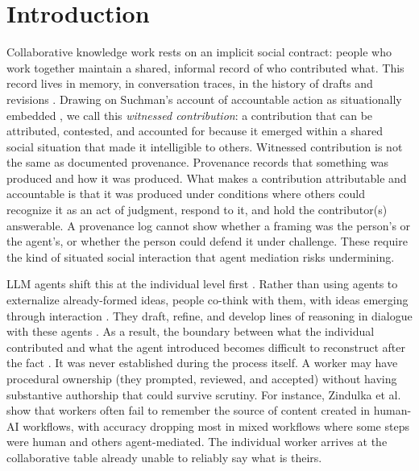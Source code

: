 \documentclass[manuscript,review]{acmart}
\begin{document}
\section{Introduction}
Collaborative knowledge work rests on an implicit social contract: people who work together maintain a shared, informal record of who contributed what. This record lives in memory, in conversation traces, in the history of drafts and revisions \cite{birnholtz2012tracking}. Drawing on Suchman's account of accountable action as situationally embedded \cite{suchman1987plans}, we call this \textit{witnessed contribution}: a contribution that can be attributed, contested, and accounted for because it emerged within a shared social situation that made it intelligible to others. Witnessed contribution is not the same as documented provenance. Provenance records that something was produced and how it was produced. What makes a contribution attributable and accountable is that it was produced under conditions where others could recognize it as an act of judgment, respond to it, and hold the contributor(s) answerable. A provenance log cannot show whether a framing was the person's or the agent's, or whether the person could defend it under challenge. These require the kind of situated social interaction that agent mediation risks undermining.


LLM agents shift this at the individual level first \cite{he2025exploring}. Rather than using agents to externalize already-formed ideas, people co-think with them, with ideas emerging through interaction \cite{hoque2024hallmark, heyman2024supermind}. They draft, refine, and develop lines of reasoning in dialogue with these agents \cite{han2024teams}. As a result, the boundary between what the individual contributed and what the agent introduced becomes difficult to reconstruct after the fact \cite{zindulka2025ai, he2025exploring}. It was never established during the process itself. A worker may have procedural ownership (they prompted, reviewed, and accepted) without having substantive authorship that could survive scrutiny. For instance, Zindulka et al. \cite{zindulka2025ai} show that workers often fail to remember the source of content created in human-AI workflows, with accuracy dropping most in mixed workflows where some steps were human and others agent-mediated. The individual worker arrives at the collaborative table already unable to reliably say what is theirs.
\end{document}
